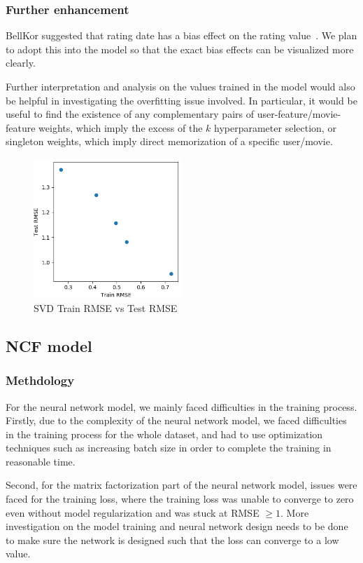 \documentclass[final]{cvpr}
\begin{document}
\subsubsection{Further enhancement}
BellKor suggested that rating date has a bias effect on the rating value~\cite{BellKor2008}.
We plan to adopt this into the model so that
the exact bias effects can be visualized more clearly.

Further interpretation and analysis on the values trained in the model
would also be helpful in investigating the overfitting issue involved.
In particular, it would be useful to find the existence of
any complementary pairs of user-feature/movie-feature weights,
which imply the excess of the $k$ hyperparameter selection,
or singleton weights,
which imply direct memorization of a specific user/movie.

\begin{figure}
	\includegraphics[width=0.5\textwidth]{screenshot20210422225123.png}
	\caption{\ac{SVD} Train \ac{RMSE} vs Test \ac{RMSE}}
	\label{fig:svd-rmse-scatter}
\end{figure}

\subsection{\ac{NCF} model}
\subsubsection{Methdology}
For the neural network model, we mainly faced difficulties in the training process.
Firstly, due to the complexity of the neural network model,
we faced difficulties in the training process for the whole dataset,
and had to use optimization techniques such as increasing batch size in order to complete the training in reasonable time.

Second, for the matrix factorization part of the neural network model,
issues were faced for the training loss,
where the training loss was unable to converge to zero even without model regularization and was stuck at RMSE $\ge 1$.
More investigation on the model training and neural network design needs to be done
to make sure the network is designed such that the loss can converge to a low value.
\end{document}
